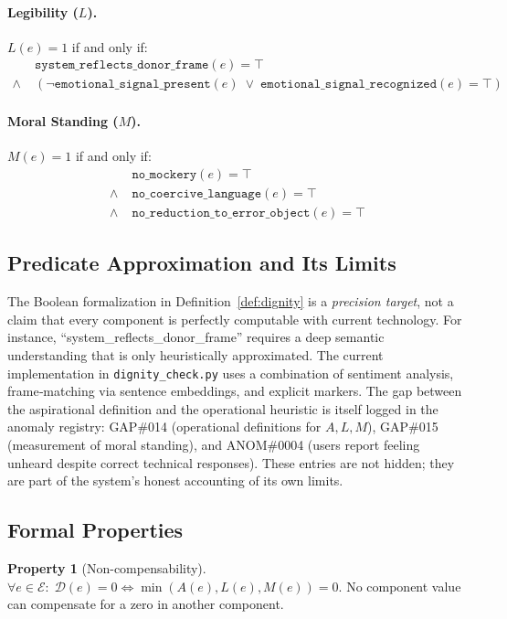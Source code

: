 \documentclass[12pt,a4paper]{article}
\theoremstyle{definition}
\newtheorem{property}{Property}[section]
\theoremstyle{remark}
\newcommand{\D}{\mathcal{D}}
\newcommand{\E}{\mathcal{E}}
\begin{document}
\paragraph{Legibility ($L$).}
$L(e) = 1$ if and only if:
\begin{align*}
  &\texttt{system\_reflects\_donor\_frame}(e) = \top \\
  \wedge\; &(\neg\texttt{emotional\_signal\_present}(e) \;\vee\;
    \texttt{emotional\_signal\_recognized}(e) = \top)
\end{align*}

\paragraph{Moral Standing ($M$).}
$M(e) = 1$ if and only if:
\begin{align*}
  &\texttt{no\_mockery}(e) = \top \\
  \wedge\; &\texttt{no\_coercive\_language}(e) = \top \\
  \wedge\; &\texttt{no\_reduction\_to\_error\_object}(e) = \top
\end{align*}

\subsection{Predicate Approximation and Its Limits}
\label{sec:limits-predicate}

The Boolean formalization in Definition~\ref{def:dignity} is a \emph{precision target},
not a claim that every component is perfectly computable with current technology.
For instance, ``system\_reflects\_donor\_frame'' requires a deep semantic understanding
that is only heuristically approximated. The current implementation in
\texttt{dignity\_check.py} uses a combination of sentiment analysis, frame‑matching
via sentence embeddings, and explicit markers. The gap between the aspirational
definition and the operational heuristic is itself logged in the anomaly registry:
GAP\#014 (operational definitions for $A,L,M$), GAP\#015 (measurement of moral standing),
and ANOM\#0004 (users report feeling unheard despite correct technical responses).
These entries are not hidden; they are part of the system’s honest accounting of its
own limits.

\subsection{Formal Properties}

\begin{property}[Non-compensability]
$\forall e \in \E:\; \D(e) = 0 \iff \min(A(e),L(e),M(e)) = 0$.
No component value can compensate for a zero in another component.
\end{property}
\end{document}
